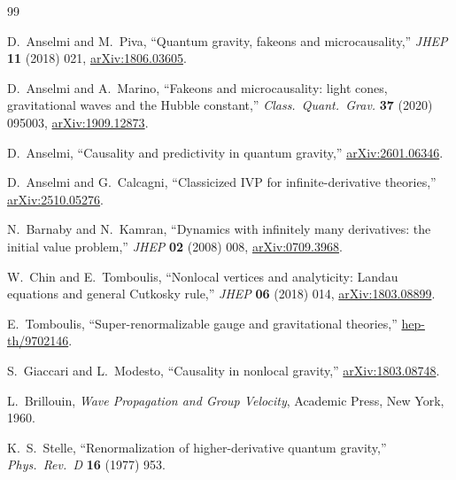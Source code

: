 \documentclass[11pt,a4paper]{article}
\begin{document}
\begin{thebibliography}{99}

D.~Anselmi and M.~Piva,
``Quantum gravity, fakeons and microcausality,''
\emph{JHEP} \textbf{11} (2018) 021,
\href{https://arxiv.org/abs/1806.03605}{arXiv:1806.03605}.

D.~Anselmi and A.~Marino,
``Fakeons and microcausality: light cones, gravitational waves and the Hubble constant,''
\emph{Class.\ Quant.\ Grav.} \textbf{37} (2020) 095003,
\href{https://arxiv.org/abs/1909.12873}{arXiv:1909.12873}.

D.~Anselmi,
``Causality and predictivity in quantum gravity,''
\href{https://arxiv.org/abs/2601.06346}{arXiv:2601.06346}.

D.~Anselmi and G.~Calcagni,
``Classicized IVP for infinite-derivative theories,''
\href{https://arxiv.org/abs/2510.05276}{arXiv:2510.05276}.

N.~Barnaby and N.~Kamran,
``Dynamics with infinitely many derivatives: the initial value problem,''
\emph{JHEP} \textbf{02} (2008) 008,
\href{https://arxiv.org/abs/0709.3968}{arXiv:0709.3968}.

W.~Chin and E.~Tomboulis,
``Nonlocal vertices and analyticity: Landau equations and general Cutkosky rule,''
\emph{JHEP} \textbf{06} (2018) 014,
\href{https://arxiv.org/abs/1803.08899}{arXiv:1803.08899}.

E.~Tomboulis,
``Super-renormalizable gauge and gravitational theories,''
\href{https://arxiv.org/abs/hep-th/9702146}{hep-th/9702146}.

S.~Giaccari and L.~Modesto,
``Causality in nonlocal gravity,''
\href{https://arxiv.org/abs/1803.08748}{arXiv:1803.08748}.

L.~Brillouin,
\emph{Wave Propagation and Group Velocity},
Academic Press, New York, 1960.

K.~S.~Stelle,
``Renormalization of higher-derivative quantum gravity,''
\emph{Phys.\ Rev.\ D} \textbf{16} (1977) 953.

\end{thebibliography}
\end{document}
